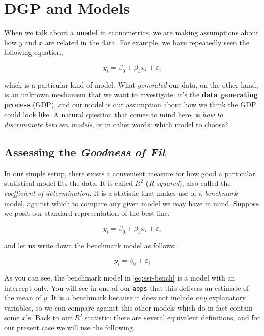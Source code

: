 \documentclass[]{book}
\theoremstyle{definition}
\theoremstyle{definition}
\theoremstyle{definition}
\theoremstyle{remark}
\begin{document}
\section{DGP and Models}\label{dgp-and-models}

When we talk about a \textbf{model} in econometrics, we are making
assumptions about how \(y\) and \(x\) are related in the data. For
example, we have repeatedly seen the following equation,

\[
y_i = \beta_0 + \beta_1 x_i + \varepsilon_i 
\]

which is a particular kind of model. What \emph{generated} our data, on
the other hand, is an unknown mechanism that we want to investigate:
it's the \textbf{data generating process} (GDP), and our model is our
assumption about how we think the GDP could look like. A natural
question that comes to mind here, is \emph{how to discriminate between
models}, or in other words: which model to choose?

\subsection{\texorpdfstring{Assessing the \emph{Goodness of
Fit}}{Assessing the Goodness of Fit}}\label{assessing-the-goodness-of-fit}

In our simple setup, there exists a convenient measure for how good a
particular statistical model fits the data. It is called \(R^2\)
(\emph{R squared}), also called the \emph{coefficient of determination}.
It is a statistic that makes use of a \emph{benchmark} model, against
which to compare any given model we may have in mind. Suppose we posit
our standard representation of the best line:

\[
y_i = \beta_0 + \beta_1 x_i + \varepsilon_i \label{eq:ssr-mod} 
\]

and let us write down the benchmark model as follows:

\[
y_i = \beta_0 + \varepsilon_i \label{eq:ssr-bench}
\]

As you can see, the benchmark model in \eqref{eq:ssr-bench} is a model
with an intercept only. You will see in one of our \texttt{apps} that
this delivers an estimate of the mean of \(y\). It is a benchmark
because it does not include \emph{any} explanatory variables, so we can
compare against this other models which do in fact contain some \(x\)'s.
Back to our \(R^2\) statistic: there are several equivalent definitions,
and for our present case we will use the following.
\end{document}
